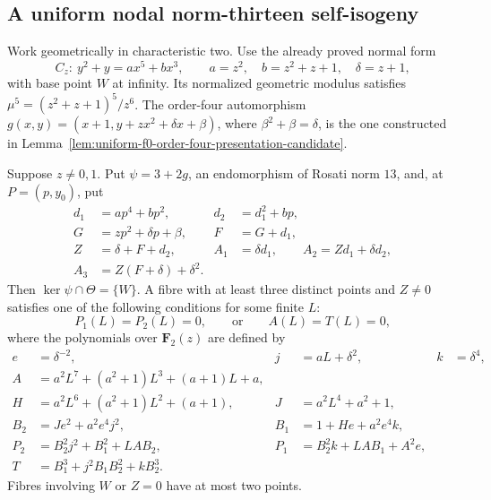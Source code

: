 \subsection{A uniform nodal norm-thirteen self-isogeny}
\label{subsec:uniform-thirteen-theta-candidate}

Work geometrically in characteristic two. Use the already proved normal form
\[
 C_z:\ y^2+y=ax^5+bx^3,\qquad
 a=z^2,\quad b=z^2+z+1,\quad \delta=z+1,
\]
with base point $W$ at infinity. Its normalized geometric modulus satisfies
$\mu^5=(z^2+z+1)^5/z^6$. The order-four automorphism
$g(x,y)=(x+1,y+zx^2+\delta x+\beta)$, where
$\beta^2+\beta=\delta$, is the one constructed in
Lemma~\ref{lem:uniform-f0-order-four-presentation-candidate}.

\begin{lemma}
\label{lem:uniform-thirteen-generic-fibres-candidate}
Suppose $z\ne0,1$. Put $\psi=3+2g$, an endomorphism of Rosati norm
$13$, and, at $P=(p,y_0)$, put
\[
\begin{aligned}
 d_1&=ap^4+bp^2,&d_2&=d_1^2+bp,\\
 G&=zp^2+\delta p+\beta,&F&=G+d_1,\\
 Z&=\delta+F+d_2,&
 A_1&=\delta d_1,\qquad A_2=Zd_1+\delta d_2,\\
 A_3&=Z(F+\delta)+\delta^2.
\end{aligned}
\tag{T13.1}
\]
Then $\ker\psi\cap\Theta=\{W\}$. A fibre with at least three
distinct points and $Z\ne0$ satisfies one of the following conditions
for some finite $L$:
\[
 P_1(L)=P_2(L)=0,\qquad\text{or}\qquad A(L)=T(L)=0,
\tag{T13.2}
\]
where the polynomials over $\mathbf F_2(z)$ are defined by
\[
\begin{aligned}
 e&=\delta^{-2},&j&=aL+\delta^2,&k&=\delta^4,\\
 A&=a^2L^7+(a^2+1)L^3+(a+1)L+a,\\
 H&=a^2L^6+(a^2+1)L^2+(a+1),&J&=a^2L^4+a^2+1,\\
 B_2&=Je^2+a^2e^4j^2,&B_1&=1+He+a^2e^4k,\\
 P_2&=B_2^2j^2+B_1^2+LA B_2,&
 P_1&=B_2^2k+LA B_1+A^2e,\\
 T&=B_1^3+j^2B_1B_2^2+kB_2^3.
\end{aligned}
\tag{T13.3}
\]
Fibres involving $W$ or $Z=0$ have at most two points.
\end{lemma}
